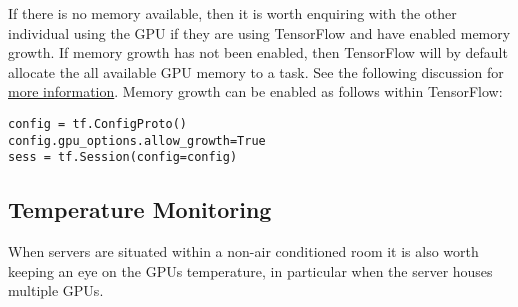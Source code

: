 \documentclass[
]{book}
\begin{document}
If there is no memory available, then it is worth enquiring with the other individual using the GPU if they are using TensorFlow and have enabled memory growth. If memory growth has not been enabled, then TensorFlow will by default allocate the all available GPU memory to a task. See the following discussion for \href{https://stackoverflow.com/questions/34199233/how-to-prevent-tensorflow-from-allocating-the-totality-of-a-gpu-memory}{more information}. Memory growth can be enabled as follows within TensorFlow:

\begin{verbatim}
config = tf.ConfigProto()
config.gpu_options.allow_growth=True
sess = tf.Session(config=config)
\end{verbatim}

\hypertarget{temperature-monitoring}{%
\subsection{Temperature Monitoring}\label{temperature-monitoring}}

When servers are situated within a non-air conditioned room it is also worth keeping an eye on the GPUs temperature, in particular when the server houses multiple GPUs.

  
\end{document}
